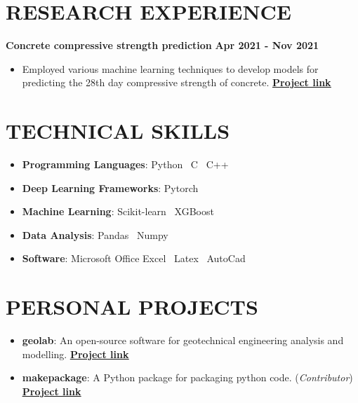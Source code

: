 \documentclass[letterpaper, 12pt]{article}
\newcommand{\cvsection}[1]{
	
	\section*{#1}
}
\newcommand{\itemizeMargin}{11pt}
\begin{document}
	
	\cvsection{RESEARCH EXPERIENCE}
	
	\textbf{Concrete compressive strength prediction} \hfill \textbf{Apr 2021 - Nov 2021}
	
	\begin{itemize}[leftmargin=\itemizeMargin]
		
		\item Employed various machine learning techniques to develop models for predicting the 28th day compressive strength of concrete. \href{https://www.github.com/patrickboateng/strength-prediction}{\underline{\textbf{Project link}}}
		
	\end{itemize}
	
	
	\cvsection{TECHNICAL SKILLS}
	
	\begin{itemize}[leftmargin=\itemizeMargin]
		
		\item \textbf{Programming Languages}: Python \vrule \, C \vrule \, C++
		\item \textbf{Deep Learning Frameworks}: Pytorch
		\item \textbf{Machine Learning}: Scikit-learn \vrule \, XGBoost
		\item \textbf{Data Analysis}: Pandas \vrule \, Numpy
		\item \textbf{Software}: Microsoft Office Excel \vrule \, Latex \vrule \, AutoCad
		
	\end{itemize}
	
	
	\cvsection{PERSONAL PROJECTS}
	
	\begin{itemize}[leftmargin=\itemizeMargin]
		
		\item \textbf{geolab}: An open-source software for geotechnical engineering analysis and modelling. \href{https://www.github.com/patrickboateng/geolab}{\underline{\textbf{Project link}}}
		
		\item \textbf{makepackage}: A Python package for packaging python code. (\textit{Contributor})
		\href{https://github.com/nyggus/makepackage}{\underline{\textbf{Project link}}}
		
	\end{itemize}
	
\end{document}
